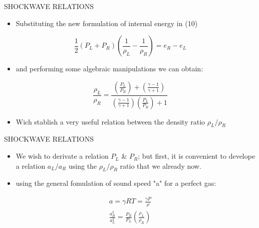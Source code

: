 \documentclass{beamer}
\begin{document}
\begin{frame}{SHOCKWAVE RELATIONS}
  \begin{itemize}
   \item Substituting the new formulation of internal energy in \alert{(10)}
  \end{itemize}  
  \begin{equation}
   \frac{1}{2}\left(P_L+P_R\right)\left(\frac{1}{\rho_L}-\frac{1}{\rho_R}\right)=e_R-e_L \nonumber
  \end{equation}
  \begin{itemize}
   \item and performing some algebraic manipulations we can obtain:
  \end{itemize}
  \begin{equation}
   \frac{\rho_L}{\rho_R}=\frac{\left(\frac{P_L}{P_R}\right)+\left(\frac{\gamma-1}{\gamma+1}\right)}{\left(\frac{\gamma-1}{\gamma+1}\right)\left(\frac{P_L}{P_R}\right)+1}
  \end{equation}
  \begin{itemize}
   \item Wich stablish a very useful relation between the density ratio $\rho_L/ \rho_R$
  \end{itemize}
\end{frame}

\begin{frame}{SHOCKWAVE RELATIONS}
  \begin{itemize}
   \item We wish to derivate a relation $P_L$ \& $P_R$; but first, it is convenient to develope a relation $a_L/a_R$ using the $\rho_L/ \rho_R$ ratio that we already now.
   \item using the general fomulation of sound speed "a" for a perfect gas:
  \end{itemize}  
  \begin{eqnarray}
    a=\gamma RT=\frac{\gamma P}{\rho} \nonumber \\
    \frac{a_R^2}{a_L^2}=\frac{P_R}{P_L}\left ( \frac{\rho_L}{\rho_R} \right ) \nonumber
  \end{eqnarray}
\end{frame}
\end{document}
